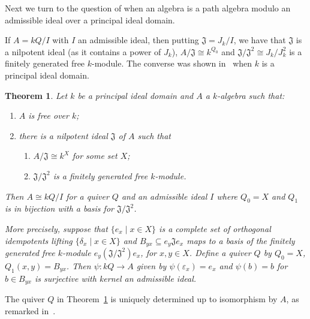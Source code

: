 \documentclass[reqno,11pt]{amsart}
\newcommand{\Tor}{\mathop{\mathrm{Tor}}\nolimits}
\newtheorem{Thm}{Theorem}[section]
\numberwithin{equation}{section}
\begin{document}

Next we turn to the question of when an algebra is a path algebra modulo an admissible ideal over a principal ideal domain.

If $A=kQ/I$ with $I$ an admissible ideal, then putting $\mathfrak J=J_k/I$, we have that $\mathfrak J$ is a nilpotent ideal (as it contains a power of $J_k$), $A/\mathfrak J\cong k^{Q_0}$ and $\mathfrak J/\mathfrak J^2\cong J_k/J_k^2$ is a finitely generated free $k$-module.  The converse was shown in~\cite{bandquiver} when $k$ is a principal ideal domain.  
\begin{Thm}\label{t:gabriel}
    Let $k$ be a principal ideal domain and $A$ a $k$-algebra such that:
    \begin{enumerate}
        \item $A$ is free over $k$;
        \item there is a nilpotent ideal $\mathfrak J$ of $A$ such that 
        \begin{enumerate}
            \item $A/\mathfrak J\cong k^X$ for some set $X$;
            \item $\mathfrak J/\mathfrak J^2$ is a finitely generated free $k$-module. 
        \end{enumerate}
    \end{enumerate}
   Then $A\cong kQ/I$ for a quiver $Q$ and an admissible ideal $I$ where $Q_0=X$ and $Q_1$ is in bijection with a basis for $\mathfrak J/\mathfrak J^2$. 

   More precisely, suppose that $\{e_x\mid x\in X\}$ is a complete set of orthogonal idempotents lifting $\{\delta_x\mid x\in X\}$ and $B_{yx}\subseteq e_y\mathfrak Je_x$ maps to a basis of the finitely generated free $k$-module $e_y(\mathfrak J/\mathfrak J^2)e_x$, for $x,y\in X$.   Define a quiver $Q$ by  $Q_0=X$, $Q_1(x,y) =B_{yx}$.  Then $\psi\colon kQ\to A$ given by $\psi(\varepsilon_x) = e_x$ and $\psi(b) =b$ for $b\in B_{yx}$ is surjective with kernel an admissible ideal.  
\end{Thm}


    The quiver $Q$ in Theorem~\ref{t:gabriel} is uniquely determined up to isomorphism by $A$, as remarked in~\cite{bandquiver}.

\end{document}
